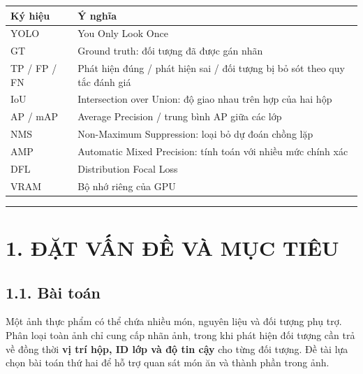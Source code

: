 \documentclass[
  vietnamese,
  12pt,
  a4paper,
]{article}
\newcounter{none} %
\begin{document}
\begingroup\small\setlength{\tabcolsep}{4pt}\renewcommand{\arraystretch}{1.12}

{\def\LTcaptype{none} %
\begin{longtable}[]{@{}
  >{\raggedright\arraybackslash}p{}
  >{\raggedright\arraybackslash}p{}@{}}
\toprule\noalign{}
\begin{minipage}[b]{\linewidth}\raggedright
Ký hiệu
\end{minipage} & \begin{minipage}[b]{\linewidth}\raggedright
Ý nghĩa
\end{minipage} \\
\midrule\noalign{}
\endhead
\bottomrule\noalign{}
\endlastfoot
YOLO & You Only Look Once \\
GT & Ground truth: đối tượng đã được gán nhãn \\
TP / FP / FN & Phát hiện đúng / phát hiện sai / đối tượng bị bỏ sót theo
quy tắc đánh giá \\
IoU & Intersection over Union: độ giao nhau trên hợp của hai hộp \\
AP / mAP & Average Precision / trung bình AP giữa các lớp \\
NMS & Non-Maximum Suppression: loại bỏ dự đoán chồng lặp \\
AMP & Automatic Mixed Precision: tính toán với nhiều mức chính xác \\
DFL & Distribution Focal Loss \\
VRAM & Bộ nhớ riêng của GPU \\
\end{longtable}
}

\endgroup

\begin{center}\rule{0.5\linewidth}{0.5pt}\end{center}

\section{1. ĐẶT VẤN ĐỀ VÀ MỤC
TIÊU}\label{ux111ux1eb7t-vux1ea5n-ux111ux1ec1-vuxe0-mux1ee5c-tiuxeau}

\subsection{1.1. Bài toán}\label{buxe0i-touxe1n}

Một ảnh thực phẩm có thể chứa nhiều món, nguyên liệu và đối tượng phụ
trợ. Phân loại toàn ảnh chỉ cung cấp nhãn ảnh, trong khi phát hiện đối
tượng cần trả về đồng thời \textbf{vị trí hộp, ID lớp và độ tin cậy} cho
từng đối tượng. Đề tài lựa chọn bài toán thứ hai để hỗ trợ quan sát món
ăn và thành phần trong ảnh.
\end{document}
